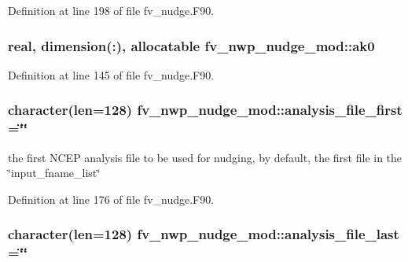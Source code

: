 Definition at line 198 of file fv\-\_\-nudge.\-F90.

\subsubsection[{ak0}]{\setlength{\rightskip}{0pt plus 5cm}real, dimension(\-:), allocatable fv\-\_\-nwp\-\_\-nudge\-\_\-mod\-::ak0\hspace{0.3cm}{\ttfamily [private]}}\label{classfv__nwp__nudge__mod_a53a22f63c5e330aa0ee01b47aa9778a1}


Definition at line 145 of file fv\-\_\-nudge.\-F90.

\subsubsection[{analysis\-\_\-file\-\_\-first}]{\setlength{\rightskip}{0pt plus 5cm}character(len=128) fv\-\_\-nwp\-\_\-nudge\-\_\-mod\-::analysis\-\_\-file\-\_\-first =\char`\"{}\char`\"{}\hspace{0.3cm}{\ttfamily [private]}}\label{classfv__nwp__nudge__mod_aa599ebe974dc91c791f9b5a81c75d59b}


the first N\-C\-E\-P analysis file to be used for nudging, by default, the first file in the \char`\"{}input\-\_\-fname\-\_\-list\char`\"{} 



Definition at line 176 of file fv\-\_\-nudge.\-F90.

\subsubsection[{analysis\-\_\-file\-\_\-last}]{\setlength{\rightskip}{0pt plus 5cm}character(len=128) fv\-\_\-nwp\-\_\-nudge\-\_\-mod\-::analysis\-\_\-file\-\_\-last =\char`\"{}\char`\"{}\hspace{0.3cm}{\ttfamily [private]}}\label{classfv__nwp__nudge__mod_ab3049eb4b3e719220321b47aad4303ba}


